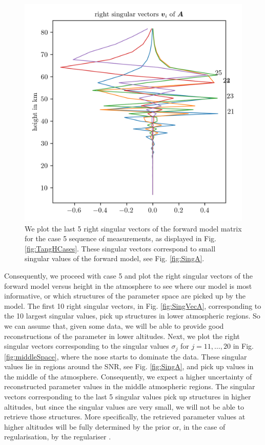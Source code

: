 \begin{figure}[ht!]
	\centering
	\includegraphics{NullVecA.png}
	\caption[Last 5 right singular vectors of forward model.]{We plot the last 5 right singular vectors of the forward model matrix for the case 5 sequence of measurements, as displayed in Fig. \ref{fig:TangHCases}. These singular vectors correspond to small singular values of the forward model, see Fig. \ref{fig:SingA}.}
	\label{fig:nullSpace}
\end{figure}

Consequently, we proceed with case 5 and plot the right singular vectors of the forward model versus height in the atmosphere to see where our model is most informative, or which structures of the parameter space are picked up by the model.
The first 10 right singular vectors, in Fig. \ref{fig:SingVecA}, corresponding to the 10 largest singular values, pick up structures in lower atmospheric regions.
So we can assume that, given some data, we will be able to provide good reconstructions of the parameter in lower altitudes.
Next, we plot the right singular vectors corresponding to the singular values $\sigma_j$ for $j = 11, \dots, 20$ in Fig. \ref{fig:middleSpace}, where the nose starts to dominate the data.
These singular values lie in regions around the SNR, see Fig. \ref{fig:SingA}, and pick up values in the middle of the atmosphere.
Consequently, we expect a higher uncertainty of reconstructed parameter values in the middle atmospheric regions.
The singular vectors corresponding to the last 5 singular values pick up structures in higher altitudes, but since the singular values are very small, we will not be able to retrieve those structures.
More specifically, the retrieved parameter values at higher altitudes will be fully determined by the prior or, in the case of regularisation, by the regulariser \cite{tan2016LecNot}.

